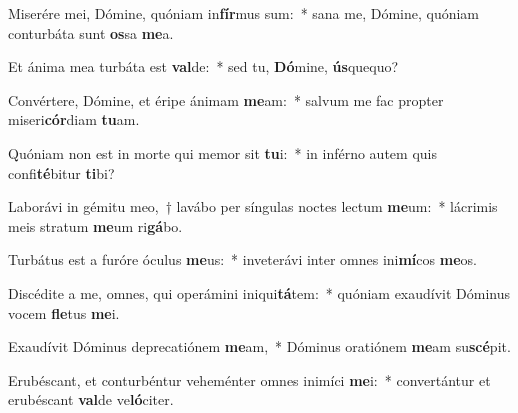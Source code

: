 \item Miserére mei, Dómine, quóniam in\textbf{fír}mus sum:~* sana me, Dómine, quóniam conturbáta sunt \textbf{os}sa \textbf{me}a.
\item Et ánima mea turbáta est \textbf{val}de:~* sed tu, \textbf{Dó}mine, \textbf{ús}quequo?
\item Convértere, Dómine, et éripe ánimam \textbf{me}am:~* salvum me fac propter miseri\textbf{cór}diam \textbf{tu}am.
\item Quóniam non est in morte qui memor sit \textbf{tu}i:~* in inférno autem quis confi\textbf{té}bitur \textbf{ti}bi?
\item Laborávi in gémitu meo,~† lavábo per síngulas noctes lectum \textbf{me}um:~* lácrimis meis stratum \textbf{me}um ri\textbf{gá}bo.
\item Turbátus est a furóre óculus \textbf{me}us:~* inveterávi inter omnes ini\textbf{mí}cos \textbf{me}os.
\item Discédite a me, omnes, qui operámini iniqui\textbf{tá}tem:~* quóniam exaudívit Dóminus vocem \textbf{fle}tus \textbf{me}i.
\item Exaudívit Dóminus deprecatiónem \textbf{me}am,~* Dóminus oratiónem \textbf{me}am su\textbf{scé}pit.
\item Erubéscant, et conturbéntur veheménter omnes inimíci \textbf{me}i:~* convertántur et erubéscant \textbf{val}de ve\textbf{ló}citer.
